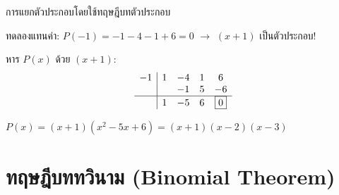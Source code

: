 \documentclass[11pt, aspectratio=169]{beamer}
\begin{document}
\begin{frame}{การแยกตัวประกอบโดยใช้ทฤษฎีบทตัวประกอบ}
  \begin{exambox}
    ทดลองแทนค่า: $P(-1) = -1-4-1+6 = 0$ $\rightarrow$ $(x+1)$ เป็นตัวประกอบ!

    หาร $P(x)$ ด้วย $(x+1)$:
    \[
    \begin{array}{c|cccc}
      -1 & 1 & -4 & 1 & 6 \\
         &    & -1 & 5 & -6 \\
      \hline
         & 1 & -5 & 6 & \boxed{0}
    \end{array}
    \]

    $P(x) = (x+1)(x^2 - 5x + 6) = (x+1)(x-2)(x-3)$
  \end{exambox}
\end{frame}

\section{ทฤษฎีบททวินาม (Binomial Theorem)}
\end{document}
